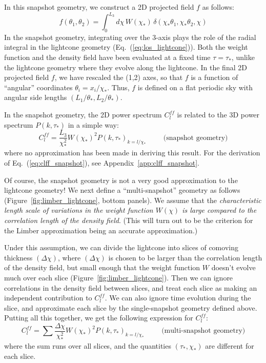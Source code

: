 \documentclass[aps,prd,superscriptaddress,groupedaddress,nofootinbib,nobibnotes]{revtex4}
\newcommand{\be}{\begin{equation}}
\newcommand{\ee}{\end{equation}}
\begin{document}
In this snapshot geometry, we construct a 2D projected field $f$ as follows:
\be
f(\theta_1, \theta_2) = \int_0^{L_3} d\chi \, W(\chi_*) \, \delta(\chi_* \theta_1, \chi_* \theta_2, \chi)  \label{eq:los_snapshot}
\ee
In the snapshot geometry, integrating over the 3-axis plays the role of the radial integral in the 
lightcone geometry (Eq.~(\ref{eq:los_lightcone})).
Both the weight function and the density field have been evaluated at a fixed time $\tau=\tau_*$,
unlike the lightcone geometry where they evolve along the lightcone.
In the final 2D projected field $f$, we have rescaled the (1,2) axes, so that $f$ is a function
of ``angular'' coordinates $\theta_i = x_i / \chi_*$.
Thus, $f$ is defined on a flat periodic sky with angular side lengths $(L_1/\theta_*, L_2/\theta_*)$.

In the snapshot geometry, the 2D power spectrum $C_l^{ff}$ is related to the 3D power spectrum $P(k,\tau_*)$ 
in a simple way:
\be
C_l^{ff} = \frac{L_3}{\chi_*^2} W(\chi_*)^2 P(k,\tau_*)_{k=l/\chi_*}
  \hspace{1cm} \mbox{(snapshot geometry)} \label{eq:clff_snapshot}
\ee
where no approximation has been made in deriving this result.
For the derivation of Eq.~(\ref{eq:clff_snapshot}), see Appendix~\ref{app:clff_snapshot}.

Of course, the snapshot geometry is not a very good approximation to the lightcone geometry!
We next define a ``multi-snapshot'' geometry as follows (Figure~\ref{fig:limber_lightcone}, bottom panels).
We assume that the {\em characteristic length scale of variations in the weight function $W(\chi)$ is large compared to the correlation length of the density field}.
(This will turn out to be the criterion for the Limber approximation being an accurate approximation.)

Under this assumption, we can divide the lightcone into slices of comoving thickness $(\Delta\chi)$,
where $(\Delta\chi)$ is chosen to be larger than the correlation length of the density field,
but small enough that the weight function $W$ doesn't evolve much over each slice (Figure~\ref{fig:limber_lightcone}).
Then we can ignore correlations in the density field between slices, and treat each slice as making
an independent contribution to $C_l^{ff}$.
We can also ignore time evolution during the slice, and approximate each slice by the single-snapshot
geometry defined above.
Putting all this together, we get the following expression for $C_l^{ff}$:
\be
C_l^{ff} = \sum \frac{\Delta\chi}{\chi_*^2} W(\chi_*)^2 P(k,\tau_*)_{k=l/\chi_*}
  \hspace{1cm} \mbox{(multi-snapshot geometry)}
\ee
where the sum runs over all slices, and the quantities $(\tau_*, \chi_*)$ are different for each slice.
\end{document}
